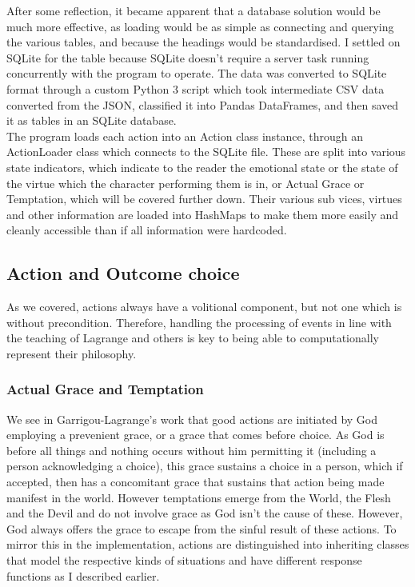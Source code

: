 \documentclass[12pt]{article}
\begin{document}
After some reflection, it became apparent that a database solution would be much more effective, as loading would be as simple as connecting and querying the various tables, and because the headings would be standardised. I settled on SQLite for the table because SQLite doesn't require a server task running concurrently with the program to operate. The data was converted to SQLite format through a custom Python 3 script which took intermediate CSV data converted from the JSON, classified it into Pandas DataFrames, and then saved it as tables in an SQLite database.\\

The program loads each action into an Action class instance, through an ActionLoader class which connects to the SQLite file. These are split into various state indicators, which indicate to the reader the emotional state or the state of the virtue which the character performing them is in, or Actual Grace or Temptation, which will be covered further down. Their various sub vices, virtues and other information are loaded into HashMaps to make them more easily and cleanly accessible than if all information were hardcoded. 

\subsection{Action and Outcome choice}
As we covered, actions always have a volitional component, but not one which is without precondition. Therefore, handling the processing of events in line with the teaching of Lagrange and others is key to being able to computationally represent their philosophy. \\
\subsubsection{Actual Grace and Temptation}
We see in Garrigou-Lagrange's work \cite{garrigou2013three} that good actions are initiated by God employing a prevenient grace, or a grace that comes before choice. As God is before all things and nothing occurs without him permitting it (including a person acknowledging a choice), this grace sustains a choice in a person, which if accepted, then has a concomitant grace that sustains that action being made manifest in the world. However temptations emerge from the World, the Flesh and the Devil and do not involve grace as God isn't the cause of these. However, God always offers the grace to escape from the sinful result of these actions. To mirror this in the implementation, actions are distinguished into inheriting classes that model the respective kinds of situations and have different response functions as I described earlier. \\
\end{document}
